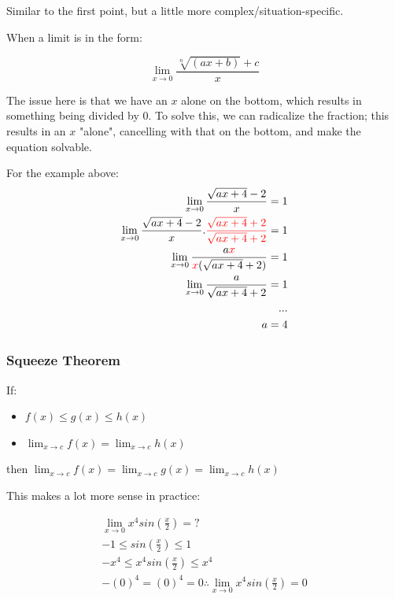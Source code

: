\documentclass[12pt]{article}
\begin{document}
Similar to the first point, but a little more complex/situation-specific.

When a limit is in the form:

$$\lim_{x\to 0}\frac{\sqrt[n]{(ax+b)} + c}{x}$$

The issue here is that we have an $x$ alone on the bottom, which results in something being divided by 0. To solve this, we can radicalize the fraction; this results in an $x$ "alone", cancelling with that on the bottom, and make the equation solvable.

For the example above:
\begin{equation}
\begin{split}
    \lim_{x\to0} \frac{\sqrt{ax + 4} - 2}{x} = 1\\
    \lim_{x\to0} \frac{\sqrt{ax + 4} - 2}{x}.\textcolor{red}{\frac{\sqrt{ax + 4} + 2}{\sqrt{ax + 4} + 2}} = 1\\
    \lim_{x\to0} \frac{a\textcolor{red}{x}}{\textcolor{red}{x}(\sqrt{ax+4}+2)} = 1\\
    \lim_{x\to 0} \frac{a}{\sqrt{ax + 4} + 2} = 1\\
    ...\\
    a = 4
\end{split}
\end{equation}
\subsubsection{Squeeze Theorem}

\begin{shaded*}
If: 
    \begin{itemize}
        \item $f(x) \leq g(x) \leq h(x)$ 

        \item $\lim_{x \to c} f(x) = \lim_{x \to c} h(x)$

    \end{itemize}
then $\lim_{x\to c} f(x) = \lim_{x \to c} g(x) = \lim_{x \to c} h(x)$
    
\end{shaded*}

This makes a lot more sense in practice:

\begin{equation}
    \begin{split}
        \lim_{x\to0} x^4 sin(\frac{x}{2}) = ?\\
        -1 \leq sin(\frac{x}{2}) \leq 1\\
        -x^4 \leq x^4 sin(\frac{x}{2}) \leq x^4\\
        -(0)^4 = (0)^4 = 0 \therefore \lim_{x\to0} x^4 sin(\frac{x}{2}) = 0
    \end{split}
\end{equation}
\end{document}
